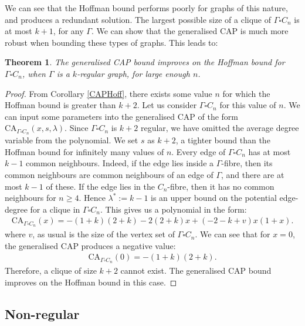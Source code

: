 \documentclass[11pt, baustms]{amsproc}
\theoremstyle{scplain}
\newtheorem{theorem}{Theorem}[section]
\newcommand\CA{\mathrm{CA}}
\renewcommand\ge{\geqslant}
\begin{document}
    We can see that the Hoffman bound performs poorly for graphs of this nature, and produces a redundant solution. The largest possible size of a clique of $\Gamma \square C_n$ is at most $k+1$, for any $\Gamma$. We can show that the generalised CAP is much more robust when bounding these types of graphs.
This leads to: %

\begin{theorem}
		\label{reg_1}
	The generalised CAP bound improves on the Hoffman bound for $\Gamma \square C_n$, when $\Gamma$ is a $k$-regular graph, for large enough $n$.
\end{theorem}


	\begin{proof}
	From Corollary \ref{CAPHoff}, there exists some value $n$ for which the Hoffman bound is greater than $k+2$. Let us consider $\Gamma \square C_n$ for this value of $n$. We can input some parameters into the generalised CAP of the form $\CA_{\Gamma \square C_n}(x,s,\lambda)$. Since $\Gamma \square C_n$ is $k+2$ regular, we have omitted the average degree variable from the polynomial. We set $s$ as $k+2$, a tighter bound than the Hoffman bound for infinitely many values of $n$. 
    Every edge of $\Gamma\square C_n$ has at most $k-1$ common neighbours. Indeed, if the edge lies inside a $\Gamma$-fibre, then its common neighbours are common neighbours of an edge of $\Gamma$, and there are at most $k-1$ of these. If the edge lies in the $C_n$-fibre, then it has no common neighbours for \(n\ge 4\). Hence $\lambda^\ast:=k-1$ is an upper bound
    on the potential edge-degree for a clique in $\Gamma \square C_n$.  This gives us a polynomial in the form: \begin{align*} \CA_{\Gamma \square C_n}(x) = -(1 + k) (2 + k) - 2 (2 + k) x + (-2 - k + v) x (1 + x). \end{align*} where $v$, as usual is the size of the vertex set of $\Gamma \square C_n$. We can see that for $x=0$, the generalised CAP produces a negative value: \begin{align*} \CA_{\Gamma \square C_n}(0) = -(1 + k) (2 + k). \end{align*} Therefore, a clique of size $k+2$ cannot exist. The generalised CAP bound improves on the Hoffman bound in this case.
	\end{proof}

\subsection{Non-regular}
\end{document}
